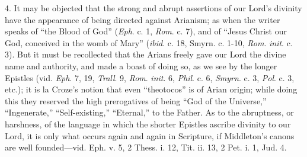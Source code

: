 4. It may be objected that the
strong and abrupt assertions of our Lord's divinity have the
appearance of being directed against Arianism; as when the writer
speaks of ``the Blood of God'' (\emph{Eph}. c. 1, \emph{Rom}. c.
7), and of ``Jesus Christ our God, conceived in the womb of Mary'' (\emph{ibid}.
c. 18, Smyrn. c. 1-10, \emph{Rom}. \emph{init}. c. 3). But it must be
recollected that the Arians freely gave our Lord the divine name and
authority, and made a boast of doing so, as we see by the longer
Epistles (vid. \emph{Eph}. 7, 19, \emph{Trall}. 9, \emph{Rom}. \emph{init}.
6, \emph{Phil}. c. 6, \emph{Smyrn}. c. 3, \emph{Pol}. c. 3, etc.); it
is la Croze's notion that even ``theotocos'' is of Arian origin; while
doing this they reserved the high prerogatives of being ``God of the
Universe,'' ``Ingenerate,'' ``Self-existing,'' ``Eternal,'' to the Father. As
to the abruptness, or harshness, of the language in which the shorter
Epistles ascribe divinity to our Lord, it is only what occurs again
and again in Scripture, if Middleton's canons are well founded—vid.
Eph. v. 5, 2 Thess. i. 12, Tit. ii. 13, 2 Pet. i. 1, Jud. 4.


